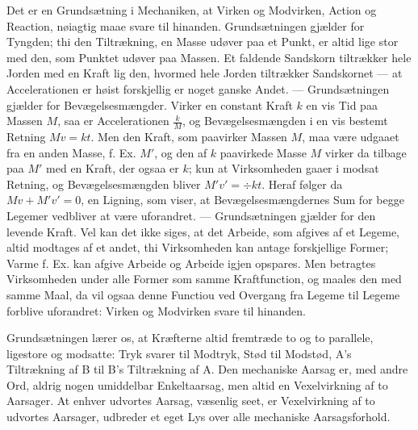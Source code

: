 \documentclass[12pt,a4paper]{book}
\begin{document}
Det er en Grundsætning i Mechaniken, at Virken og Modvirken, Action og
Reaction, nøiagtig maae svare til
hinanden. Grundsætningen gjælder for Tyngden; thi den Tiltrækning, en
Masse udøver paa et Punkt, er altid lige stor med den, som Punktet udøver
paa Massen. Et faldende Sandskorn tiltrækker hele Jorden med en Kraft lig
den, hvormed hele Jorden tiltrækker Sandskornet --- at Accelerationen er
høist forskjellig er noget ganske Andet. --- Grundsætningen gjælder for
Bevægelsesmængder. Virker en constant Kraft $k$ en vis Tid paa Massen
$M$, saa er Accelerationen $\frac{k}{M}$, og Bevægelsesmængden i en vis
bestemt Retning $Mv = kt$. Men den Kraft, som paavirker Massen $M$, maa
være udgaaet fra en anden Masse, f. Ex. $M'$, og den af $k$ paavirkede
Masse $M$ virker da tilbage paa $M'$ med en Kraft, der ogsaa er $k$; kun
at Virksomheden gaaer i modsat Retning, og Bevægelsesmængden bliver
$M'v' = \div kt$. Heraf følger da $Mv + M'v' = 0$, en Ligning, som viser,
at Bevægelsesmængdernes Sum for begge Legemer vedbliver at være
uforandret. --- Grundsætningen gjælder for den levende Kraft. Vel kan det
ikke siges, at det Arbeide, som afgives af et Legeme, altid modtages af
et andet, thi Virksomheden kan antage forskjellige Former; Varme f. Ex.
kan afgive Arbeide og Arbeide igjen opspares. Men betragtes Virksomheden
under alle Former som samme Kraftfunction, og maales den med samme Maal,
da vil ogsaa denne
Functiou ved Overgang fra Legeme til Legeme forblive uforandret: Virken
og Modvirken svare til hinanden.

Grundsætningen lærer os, at Kræfterne altid fremtræde to og to parallele,
ligestore og modsatte: Tryk svarer til Modtryk, Stød til Modstød, A's
Tiltrækning af B til B's Tiltrækning af A. Den mechaniske Aarsag er, med
andre Ord, aldrig nogen umiddelbar Enkeltaarsag, men altid en
Vexelvirkning af to Aarsager. At enhver udvortes Aarsag, væsenlig seet,
er Vexelvirkning af to udvortes Aarsager, udbreder et eget Lys over alle
mechaniske Aarsagsforhold.
\end{document}
